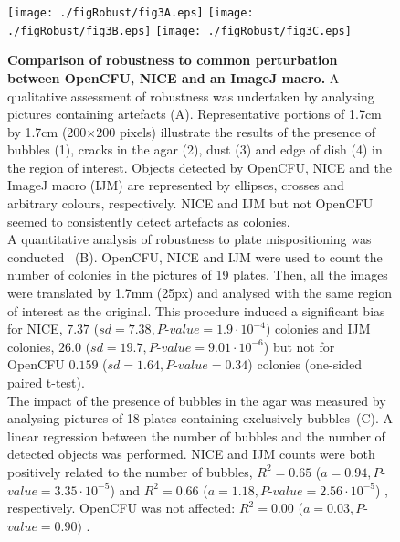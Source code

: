\documentclass[10pt]{article}
\newcommand{\IJM}{IJM}
\newcommand{\EdgeNoiseOCFU}{$0.159$ ($sd=1.64, P$-$value=0.34$)}
\newcommand{\EdgeNoiseIJM}{$26.0$ ($sd=19.7, P$-$value=9.01\cdot 10^{-6}$)}
\newcommand{\EdgeNoiseNICE}{$7.37$ ($sd=7.38,P$-$value=1.9\cdot 10^{-4}$)}
\newcommand{\BubbleNoiseOCFU}{$R^2 = 0.00$ ($a=0.03, P$-$value=0.90)$ }
\newcommand{\BubbleNoiseNICE}{$R^2 = 0.65$ ($a=0.94, P$-$value=3.35\cdot 10^{-5}$) }
\newcommand{\BubbleNoiseIJM}{$R^2 = 0.66$ ($a=1.18, P$-$value=2.56\cdot 10^{-5}$) }
\begin{document}
\begin{figure}[!ht]
\begin{center}
\texttt{[image: ./figRobust/fig3A.eps]}
\texttt{[image: ./figRobust/fig3B.eps]}
\texttt{[image: ./figRobust/fig3C.eps]}
\end{center}

\caption{{\bf Comparison of robustness to common perturbation between OpenCFU, 
NICE\cite{clarke_lowcost_2010} and an ImageJ macro\cite{cai_optimized_2011}.} 
A qualitative assessment of robustness was undertaken by analysing pictures
containing artefacts (A).
Representative portions of 1.7cm by 1.7cm (200$\times{}$200 pixels) illustrate
the results of the presence of bubbles (1), cracks in the agar (2), dust (3) and
edge of dish (4) in the region of interest. Objects detected by OpenCFU, NICE
and the ImageJ macro (\IJM) are represented by ellipses, crosses and arbitrary
colours, respectively.
NICE and \IJM{} but not OpenCFU seemed to consistently detect artefacts as
colonies.\\
A quantitative analysis of robustness to plate mispositioning was
conducted ~(B).
OpenCFU, NICE and \IJM{} were used to count the number of colonies in the
pictures of 19 plates. Then, all the images were translated by 1.7mm (25px) and
analysed with the same region of interest as the original.
This procedure induced a significant bias for NICE, \EdgeNoiseNICE{} colonies and \IJM{} colonies,
\EdgeNoiseIJM{} but not for OpenCFU \EdgeNoiseOCFU{} colonies (one-sided paired
t-test).\\
The impact of the presence of bubbles in the agar was measured by analysing
pictures of 18 plates containing exclusively bubbles~(C).
A linear regression between the number of bubbles and the number of detected
objects was performed.
NICE and \IJM{} counts were both positively related to the number of bubbles,
\BubbleNoiseNICE{} and \BubbleNoiseIJM{}, respectively. OpenCFU was not affected:
\BubbleNoiseOCFU{}.
}
\label{figRobust}
\end{figure}
\end{document}
